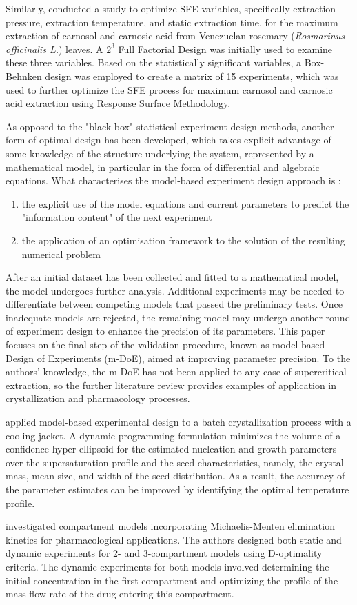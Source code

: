 \documentclass[../Article_Sensitivity_Analsysis.tex]{subfiles}
\begin{document}
	Similarly, \citet{Caldera2012} conducted a study to optimize SFE variables, specifically extraction pressure, extraction temperature, and static extraction time, for the maximum extraction of carnosol and carnosic acid from Venezuelan rosemary (\textit{Rosmarinus officinalis L.}) leaves. A $2^3$ Full Factorial Design was initially used to examine these three variables. Based on the statistically significant variables, a Box-Behnken design was employed to create a matrix of 15 experiments, which was used to further optimize the SFE process for maximum carnosol and carnosic acid extraction using Response Surface Methodology.
	
	As opposed to the "black-box" statistical experiment design methods, another form of optimal design has been developed, which takes explicit advantage of some knowledge of the structure underlying the system, represented by a mathematical model, in particular in the form of differential and algebraic equations. What characterises the model-based experiment design approach is :
	
	\begin{enumerate}
		\item the explicit use of the model equations and current parameters to predict the "information content" of the next experiment
		\item the application of an optimisation framework to the solution of the resulting numerical problem
	\end{enumerate}
	
	After an initial dataset has been collected and fitted to a mathematical model, the model undergoes further analysis. Additional experiments may be needed to differentiate between competing models that passed the preliminary tests. Once inadequate models are rejected, the remaining model may undergo another round of experiment design to enhance the precision of its parameters. This paper focuses on the final step of the validation procedure, known as model-based Design of Experiments (m-DoE), aimed at improving parameter precision. To the authors' knowledge, the m-DoE has not been applied to any case of supercritical extraction, so the further literature review provides examples of application in crystallization and pharmacology processes.
	
	\citet{Chung2000} applied model-based experimental design to a batch crystallization process with a cooling jacket. A dynamic programming formulation minimizes the volume of a confidence hyper-ellipsoid for the estimated nucleation and growth parameters over the supersaturation profile and the seed characteristics, namely, the crystal mass, mean size, and width of the seed distribution. As a result, the accuracy of the parameter estimates can be improved by identifying the optimal temperature profile.
	
	\citet{Duarte2019} investigated compartment models incorporating Michaelis-Menten elimination kinetics for pharmacological applications. The authors designed both static and dynamic experiments for 2- and 3-compartment models using D-optimality criteria. The dynamic experiments for both models involved determining the initial concentration in the first compartment and optimizing the profile of the mass flow rate of the drug entering this compartment.
	
\end{document}
